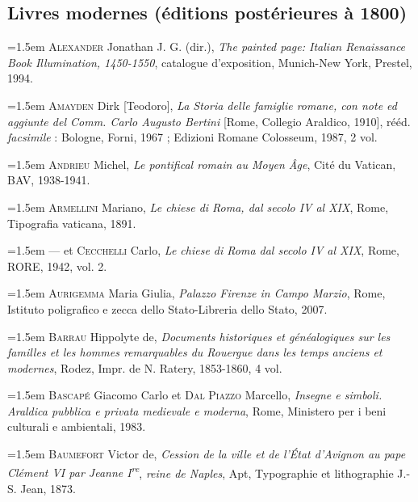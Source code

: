 \documentclass[12pt,twoside,openany]{book}
\newenvironment{PurhBibliography}
  {%
    \par
    \setlength{\parindent}{0pt}%
    \setlength{\leftskip}{0pt}%
  }
  {%
    \par
  }
\begin{document}
\subsection{Livres modernes (éditions postérieures à 1800)}

\begin{PurhBibliography}
\noindent\hangindent=1.5em \textsc{Alexander} Jonathan J. G. (dir.), \textit{The painted page: Italian Renaissance Book Illumination, 1450-1550}, catalogue d’exposition, Munich-New York, Prestel, 1994.\par
\noindent\hangindent=1.5em \textsc{Amayden} Dirk [Teodoro], \textit{La Storia delle famiglie romane, con note ed aggiunte del Comm. Carlo Augusto Bertini} [Rome, Collegio Araldico, 1910], rééd. \textit{facsimile} : Bologne, Forni, 1967 ; Edizioni Romane Colosseum, 1987, 2 vol.\par
\noindent\hangindent=1.5em \textsc{Andrieu} Michel, \textit{Le pontifical romain au Moyen Âge}, Cité du Vatican, BAV, 1938-1941.\par
\noindent\hangindent=1.5em \textsc{Armellini} Mariano, \textit{Le chiese di Roma, dal secolo IV al XIX}, Rome, Tipografia vaticana, 1891.\par
\noindent\hangindent=1.5em — et \textsc{Cecchelli} Carlo, \textit{Le chiese di Roma dal secolo IV al XIX}, Rome, \textsc{RORE}, 1942, vol. 2.\par
\noindent\hangindent=1.5em \textsc{Aurigemma} Maria Giulia, \textit{Palazzo Firenze in Campo Marzio}, Rome, Istituto poligrafico e zecca dello Stato-Libreria dello Stato, 2007.\par
\noindent\hangindent=1.5em \textsc{Barrau} Hippolyte de, \textit{Documents historiques et généalogiques sur les familles et les hommes remarquables du Rouergue dans les temps anciens et modernes}, Rodez, Impr. de N. Ratery, 1853-1860, 4 vol.\par
\noindent\hangindent=1.5em \textsc{Bascapé} Giacomo Carlo et \textsc{Dal Piazzo} Marcello, \textit{Insegne e simboli. Araldica pubblica e privata medievale e moderna}, Rome, Ministero per i beni culturali e ambientali, 1983.\par
\noindent\hangindent=1.5em \textsc{Baumefort} Victor de, \textit{Cession de la ville et de l’État d’Avignon au pape Clément VI par Jeanne I}\textit{\textsuperscript{re}},\textit{ reine de Naples}, Apt, Typographie et lithographie J.-S. Jean, 1873.\par

\end{PurhBibliography}
\end{document}
